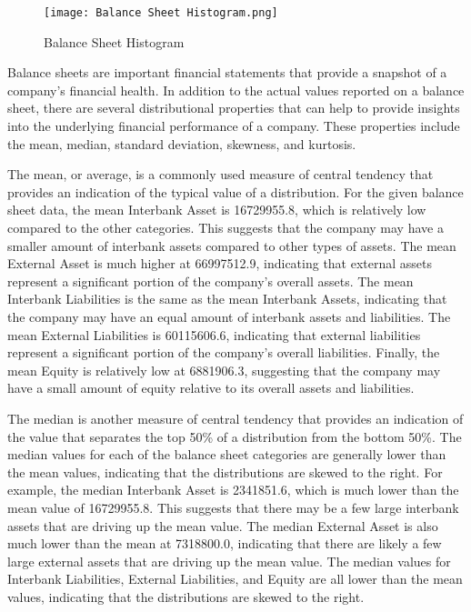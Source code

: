 \begin{figure}[H]
    \centering
    \texttt{[image: Balance Sheet Histogram.png]}
    \caption{Balance Sheet Histogram}\label{fig:Balance Sheet Histogram}
\end{figure}

Balance sheets are important financial statements\cite{williams2008financial} that provide a snapshot of a company's financial health. In addition to the actual values reported on a balance sheet, there are several distributional properties that can help to provide insights into the underlying financial performance of a company. These properties include the mean, median, standard deviation, skewness, and kurtosis.

The mean, or average, is a commonly used measure of central tendency that provides an indication of the typical value of a distribution. For the given balance sheet data, the mean Interbank Asset is 16729955.8, which is relatively low compared to the other categories. This suggests that the company may have a smaller amount of interbank assets compared to other types of assets. The mean External Asset is much higher at 66997512.9, indicating that external assets represent a significant portion of the company's overall assets. The mean Interbank Liabilities is the same as the mean Interbank Assets, indicating that the company may have an equal amount of interbank assets and liabilities. The mean External Liabilities is 60115606.6, indicating that external liabilities represent a significant portion of the company's overall liabilities. Finally, the mean Equity is relatively low at 6881906.3, suggesting that the company may have a small amount of equity relative to its overall assets and liabilities.

The median is another measure of central tendency that provides an indication of the value that separates the top 50\% of a distribution from the bottom 50\%. The median values for each of the balance sheet categories are generally lower than the mean values, indicating that the distributions are skewed to the right. For example, the median Interbank Asset is 2341851.6, which is much lower than the mean value of 16729955.8. This suggests that there may be a few large interbank assets that are driving up the mean value. The median External Asset is also much lower than the mean at 7318800.0, indicating that there are likely a few large external assets that are driving up the mean value. The median values for Interbank Liabilities, External Liabilities, and Equity are all lower than the mean values, indicating that the distributions are skewed to the right.

